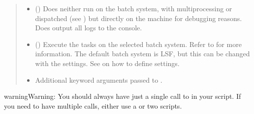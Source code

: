 \documentclass[letterpaper,10pt,english]{sphinxmanual}
\begin{document}
\begin{fulllineitems}
\begin{quote}
\begin{description}
\begin{itemize}
\item {} 
 (\sphinxstyleliteralemphasis{\sphinxupquote{, }}) \textendash{} Does neither run on the batch system, with multiprocessing
or dispatched (see {\hyperref[\detokenize{documentation/api:b2luigi.DispatchableTask}]{}}) but directly on the machine for
debugging reasons. Does output all logs to the console.

\item {} 
 (\sphinxstyleliteralemphasis{\sphinxupquote{, }}) \textendash{} Execute the tasks on the selected batch system.
Refer to {\hyperref[\detokenize{usage/quickstart:quick-start-label}]{}} for more information.
The default batch system is LSF, but this can be changed with the 
settings. See {\hyperref[\detokenize{documentation/api:b2luigi.get_setting}]{}} on how to define settings.

\item {} 
 \textendash{} Additional keyword arguments passed to .

\end{itemize}

\end{description}\end{quote}

\begin{sphinxadmonition}{warning}{Warning:}
You should always have just a single call to  in your script.
If you need to have multiple calls, either use a {\hyperref[\detokenize{documentation/api:b2luigi.WrapperTask}]{}}
or two scripts.
\end{sphinxadmonition}

\end{fulllineitems}
\end{document}
